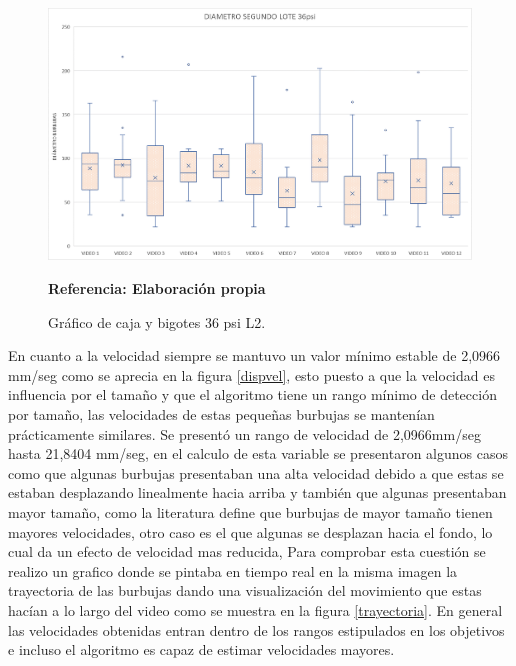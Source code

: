 \documentclass[12pt,twocolumn,a4paper]{article}
\begin{document}
\begin{figure}[h!]
	\centering
	\includegraphics[scale=0.35]{Diapro36L2.png}
	\caption{Gráfico de caja y bigotes 36 psi L2.} \textbf{Referencia: Elaboración propia} 
	\label{diapro36L2}
\end{figure}

En cuanto a la velocidad siempre se mantuvo un valor mínimo estable de 2,0966 mm/seg como se aprecia en la figura \ref{dispvel}, esto puesto a que la velocidad es influencia por el tamaño y que el algoritmo tiene un rango mínimo de detección por tamaño, las velocidades de estas pequeñas burbujas se mantenían prácticamente similares. Se presentó un rango de velocidad de 2,0966mm/seg hasta 21,8404 mm/seg, en el calculo de esta variable se presentaron algunos casos como que algunas burbujas presentaban una alta velocidad debido a que estas se estaban desplazando linealmente hacia arriba y también que algunas presentaban mayor tamaño, como la literatura define que burbujas de mayor tamaño tienen mayores velocidades, otro caso es el que algunas se desplazan hacia el fondo, lo cual da un efecto de velocidad mas reducida, Para comprobar esta cuestión se realizo un grafico donde se pintaba en tiempo real en la misma imagen la trayectoria de las burbujas dando una visualización del movimiento que estas hacían a lo largo del video como se muestra en la figura \ref{trayectoria}. En general las velocidades obtenidas entran dentro de los rangos estipulados en los objetivos e incluso el algoritmo es capaz de estimar velocidades mayores.
\end{document}
